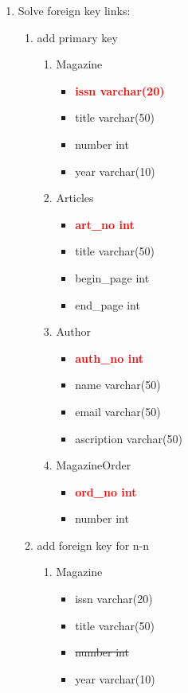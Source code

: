 \documentclass[]{article}
\begin{document}
\begin{enumerate}
\item Solve foreign key links:

\begin{enumerate}
\item add primary key

\begin{enumerate}
\item Magazine
\begin{itemize}
\item \textcolor{red}{\textbf{issn varchar(20)}}
\item title varchar(50)
\item number int
\item year varchar(10)
\end{itemize}

\item Articles
\begin{itemize}
\item \textcolor{red}{\textbf{art\_no int}}
\item title varchar(50)
\item begin\_page int
\item end\_page int
\end{itemize}

\item Author
\begin{itemize}
\item \textcolor{red}{\textbf{auth\_no int}}
\item name varchar(50)
\item email varchar(50)
\item ascription varchar(50)
\end{itemize}

\item MagazineOrder
\begin{itemize}
\item \textcolor{red}{\textbf{ord\_no int}}
\item number int
\end{itemize}
\end{enumerate}

\item add foreign key for n-n

\begin{enumerate}
\item Magazine
\begin{itemize}
\item issn varchar(20)
\item title varchar(50)
\item \sout{number int}
\item year varchar(10)
\end{itemize}


\end{enumerate}
\end{enumerate}
\end{enumerate}
\end{document}
